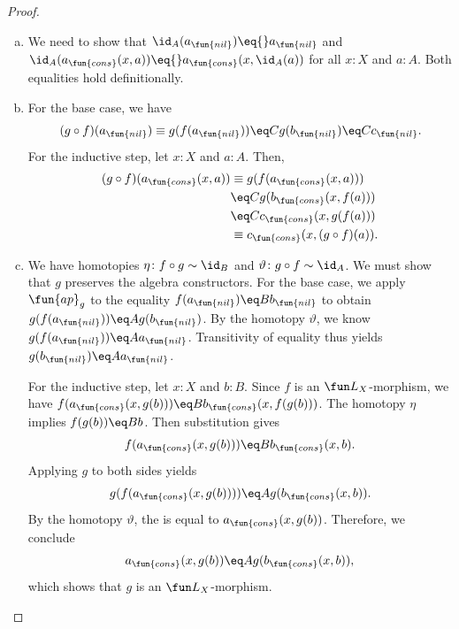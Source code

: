 \begin{proof}\ 
    \begin{enumerate}[a)]
        \item We need to show that $\id_A(a_{\fun{nil}})
        \eq{}a_{\fun{nil}}$ and $\id_A(a_{\fun{cons}}(x,a))\eq{}a_{\fun{cons}}(x,\id_A(a))$ for all $x\colon X$ and $a\colon A$. Both equalities hold definitionally.
        
        \item For the base case, we have
        \[
            (g\circ f)(a_{\fun{nil}})
                \equiv g(f(a_{\fun{nil}}))
                \eq Cg(b_{\fun{nil}})
                \eq Cc_{\fun{nil}}.
        \]
        For the inductive step, let $x\colon X$ and $a\colon A$. Then,
        \begin{align*}
            (g\circ f)(a_{\fun{cons}}(x,a))
                &\equiv g(f(a_{\fun{cons}}(x,a)))\\
                &\eq Cg(b_{\fun{cons}}(x,f(a)))\\
                &\eq Cc_{\fun{cons}}(x,g(f(a)))\\
                &\equiv c_{\fun{cons}}(x,(g\circ f)(a)).
        \end{align*}
        
        \item We have homotopies $\eta\colon f\circ g\sim\id_B$ and $\vartheta\colon g\circ f\sim\id_A$. We must show that $g$ preserves the algebra constructors. For the base case, we apply $\fun{ap}_g$ to the equality $f(a_{\fun{nil}})\eq Bb_{\fun{nil}}$ to obtain $g(f(a_{\fun{nil}}))\eq Ag(b_{\fun{nil}})$. By the homotopy $\vartheta$, we know $g(f(a_{\fun{nil}}))\eq Aa_{\fun{nil}}$. Transitivity of equality thus yields $g(b_{\fun{nil}})\eq Aa_{\fun{nil}}$.
        
        For the inductive step, let $x\colon X$ and $b\colon B$. Since $f$ is an $\fun L_X$-morphism, we have $f(a_{\fun{cons}}(x,g(b)))\eq Bb_{\fun{cons}}(x, f(g(b)))$. The homotopy $\eta$ implies $f(g(b))\eq Bb$. Then substitution gives
        \[
            f(a_{\fun{cons}}(x,g(b)))
            \eq Bb_{\fun{cons}}(x,b).
        \]
        Applying $g$ to both sides yields
        \[
            g(f(a_{\fun{cons}}(x,g(b))))
            \eq Ag(b_{\fun{cons}}(x,b)).
        \]
        By the homotopy $\vartheta$, the \lhs is equal to $a_{\fun{cons}}(x,g(b))$. Therefore, we conclude
        \[
            a_{\fun{cons}}(x,g(b))
            \eq Ag(b_{\fun{cons}}(x,b)),
        \]
        which shows that $g$ is an $\fun L_X$-morphism.\qedhere
    \end{enumerate}
\end{proof}

